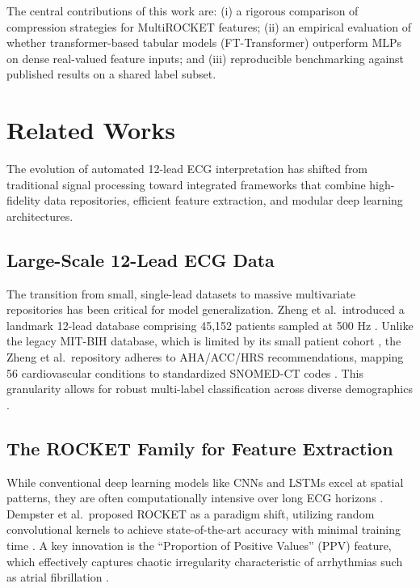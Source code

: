 \documentclass[10pt,twocolumn,letterpaper]{article}
\begin{document}
The central contributions of this work are: (i) a rigorous comparison of compression strategies for MultiROCKET features; (ii) an empirical evaluation of whether transformer-based tabular models (FT-Transformer) outperform MLPs on dense real-valued feature inputs; and (iii) reproducible benchmarking against published results on a shared label subset.


\section{Related Works}

The evolution of automated 12-lead ECG interpretation has shifted from traditional signal processing toward integrated frameworks that combine high-fidelity data repositories, efficient feature extraction, and modular deep learning architectures.

\subsection{Large-Scale 12-Lead ECG Data}

The transition from small, single-lead datasets to massive multivariate repositories has been critical for model generalization. Zheng et al.\ introduced a landmark 12-lead database comprising 45,152 patients sampled at 500 Hz \cite{zheng2022}. Unlike the legacy MIT-BIH database, which is limited by its small patient cohort \cite{frontiers2022}, the Zheng et al.\ repository adheres to AHA/ACC/HRS recommendations, mapping 56 cardiovascular conditions to standardized SNOMED-CT codes \cite{kurias2023}. This granularity allows for robust multi-label classification across diverse demographics \cite{zheng_multilabel}.

\subsection{The ROCKET Family for Feature Extraction}

While conventional deep learning models like CNNs and LSTMs excel at spatial patterns, they are often computationally intensive over long ECG horizons \cite{kth_minirocket, nuyen2024}. Dempster et al.\ proposed ROCKET as a paradigm shift, utilizing random convolutional kernels to achieve state-of-the-art accuracy with minimal training time \cite{dempster2020}. A key innovation is the ``Proportion of Positive Values'' (PPV) feature, which effectively captures chaotic irregularity characteristic of arrhythmias such as atrial fibrillation \cite{arxiv_calf}.
\end{document}
